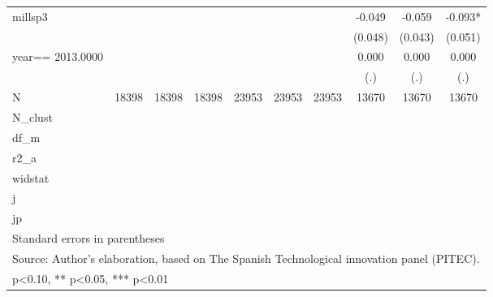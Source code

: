 \begin{table}[htbp]
\begin{tabular}{l*{9}{c}}
millsp3             &               &               &               &               &               &               &      -0.049   &      -0.059   &      -0.093*  \\
                    &               &               &               &               &               &               &     (0.048)   &     (0.043)   &     (0.051)   \\
year==  2013.0000   &               &               &               &               &               &               &       0.000   &       0.000   &       0.000   \\
                    &               &               &               &               &               &               &         (.)   &         (.)   &         (.)   \\
\hline
N                   &       18398   &       18398   &       18398   &       23953   &       23953   &       23953   &       13670   &       13670   &       13670   \\
N\_clust             &               &               &               &               &               &               &               &               &               \\
df\_m                &               &               &               &               &               &               &               &               &               \\
r2\_a                &               &               &               &               &               &               &               &               &               \\
widstat             &               &               &               &               &               &               &               &               &               \\
j                   &               &               &               &               &               &               &               &               &               \\
jp                  &               &               &               &               &               &               &               &               &               \\
\hline\hline
\multicolumn{10}{l}{\footnotesize Standard errors in parentheses}\\
\multicolumn{10}{l}{\footnotesize Source: Author's elaboration, based on The Spanish Technological innovation panel (PITEC).}\\
\multicolumn{10}{l}{\footnotesize * p<0.10, ** p<0.05, *** p<0.01}\\
\end{tabular}
\end{table}

